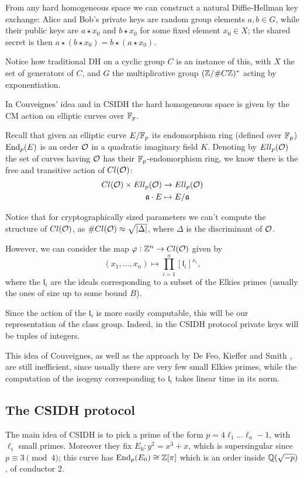 From any hard homogeneous space we can construct a natural Diffie-Hellman key exchange: Alice and Bob's private keys are random group elements $a,b\in G$, while their public keys are $a\star x_0$ and $b\star x_0$ for some fixed element $x_0\in X$; the shared secret is then $a\star(b\star x_0)=b\star(a\star x_0)$.

Notice how traditional DH on a cyclic group $C$ is an instance of this, with $X$ the set of generators of $C$, and $G$ the multiplicative group $(\mathbb{Z}/\# C\mathbb{Z})^\ast$ acting by exponentiation.

In Couveignes' idea and in CSIDH the hard homogeneous space is given by the CM action on elliptic curves over $\mathbb{F}_p$.

Recall that given an elliptic curve $E/\mathbb{F}_p$ its endomorphism ring (defined over $\mathbb{F}_p$) $\operatorname{End}_p(E)$ is an order $\mathcal{O}$ in a quadratic imaginary field $K$. Denoting by $Ell_p(\mathcal{O})$ the set of curves having $\mathcal{O}$ has their $\mathbb{F}_p$-endomorphism ring, we know there is the free and transitive action of $Cl(\mathcal{O})$:
\begin{align*}
    Cl(\mathcal{O})\times Ell_p(\mathcal{O}) & \to  Ell_p(\mathcal{O})\\
    \mathfrak{a}\cdot E & \mapsto  E/\mathfrak{a}
\end{align*}

Notice that for cryptographically sized parameters we can't compute the structure of $Cl(\mathcal{O})$, as $\# Cl(\mathcal{O})\approx \sqrt{|\Delta|}$, where $\Delta$ is the discriminant of $\mathcal{O}$.

However, we can consider the map $\varphi:\mathbb{Z}^n\to Cl(\mathcal{O})$ given by
$$(x_1,\dots,x_n)\mapsto \prod_{i=1}^n[\mathfrak{l}_i]^{x_i},$$
where the $\mathfrak{l}_i$ are the ideals corresponding to a subset of the Elkies primes (usually the ones of size up to some bound $B$).

Since the action of the $\mathfrak{l}_i$ is more easily computable, this will be our representation of the class group. Indeed, in the CSIDH protocol private keys will be tuples of integers.

This idea of Couveignes, as well as the approach by De Feo, Kieffer and Smith \cite{DeFeo_CSIDH}, are still inefficient, since usually there are very few small Elkies primes, while the computation of the isogeny corresponding to $\mathfrak{l}_i$ takes linear time in its norm.

\subsection{The CSIDH protocol}
The main idea of CSIDH is to pick a prime of the form $p=4\ell_1\dots\ell_n-1$, with $\ell_i$ small primes. Moreover they fix $E_0: y^2=x^3+x$, which is supersingular since $p\equiv3\pmod 4$; this curve has $\operatorname{End}_p(E_0)\cong\mathbb{Z}[\pi]$ which is an order inside $\mathbb{Q}(\sqrt{-p})$, of conductor $2$.

